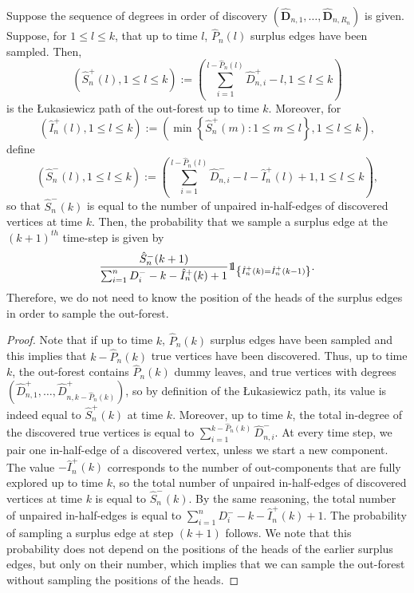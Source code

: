 \begin{lemma}\label{lemma.sampleoutforest}
Suppose the sequence of degrees in order of discovery $(\mathbf{\hat{D}}_{n,1},\dots,\mathbf{\hat{D}}_{n, R_n})$ is given. Suppose, for $1\leq l\leq k$, that up to time $l$, $\hat{P}_n(l)$ surplus edges have been sampled. Then, $$\left(\hat{S}^+_n(l),1\leq l\leq k \right):=\left(\sum_{i=1}^{l-\hat{P}_n(l)}\hat{D}^+_{n,i}-l,1\leq l\leq k\right)$$ is the \L ukasiewicz path of the out-forest up to time $k$. Moreover, for $$\left(\hat{I}^+_n(l),1\leq l\leq k\right):=\left(\min\left\{\hat{S}^+_n(m):1\leq m \leq l\right\},1\leq l \leq k \right),$$
define 
$$\left(\hat{S}^-_n(l),1\leq l \leq k\right):=\left(\sum_{i=1}^{l-\hat{P}_n(l)}\hat{D}^-_{n,i}-l-\hat{I}^+_n(l)+1,1\leq l\leq k\right),$$
so that $\hat{S}^-_n(k)$ is equal to the number of unpaired in-half-edges of discovered vertices at time $k$. Then, the probability that we sample a surplus edge at the $(k+1)^{th}$ time-step is given by
$$\frac{\hat{S}^-_n(k+1)}{\sum_{i=1}^n D^-_i-k-\hat{I}^+_n(k)+1}\one_{\left\{\hat{I}^+_n(k)=\hat{I}^+_n(k-1)\right\}}.$$
Therefore, we do not need to know the position of the heads of the surplus edges in order to sample the out-forest.
\end{lemma}
\begin{proof}
Note that if up to time $k$, $\hat{P}_n(k)$ surplus edges have been sampled and this implies that $k-\hat{P}_n(k)$ true vertices have been discovered. Thus, up to time $k$, the out-forest contains $\hat{P}_n(k)$ dummy leaves, and true vertices with degrees $(\hat{D}^+_{n,1},\dots,\hat{D}^+_{n,k-\hat{P}_n(k)})$, so by definition of the \L ukasiewicz path, its value is indeed equal to $\hat{S}^+_n(k)$ at time $k$. Moreover, up to time $k$, the total in-degree of the discovered true vertices is equal to $\sum_{i=1}^{k-\hat{P}_n(k)}\hat{D}^-_{n,i}$. At every time step, we pair one in-half-edge of a discovered vertex, unless we start a new component. The value $-\hat{I}^+_n(k)$ corresponds to the number of out-components that are fully explored up to time $k$, so the total number of unpaired in-half-edges of discovered vertices at time $k$ is equal to $\hat{S}^-_n(k)$. By the same reasoning, the total number of unpaired in-half-edges is equal to $\sum_{i=1}^n D^-_i-k-\hat{I}^+_n(k)+1$. The probability of sampling a surplus edge at step $(k+1)$ follows. We note that this probability does not depend on the positions of the heads of the earlier surplus edges, but only on their number, which implies that we can sample the out-forest without sampling the positions of the heads.
\end{proof}

